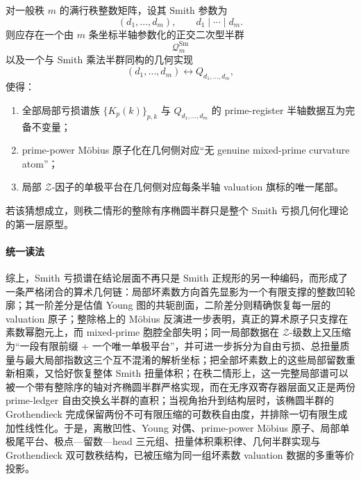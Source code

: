 \begin{conjecture}\label{conj:conclusion-smith-highrank-orthogonal-quadratic-realization}
对一般秩 \(m\) 的满行秩整数矩阵，设其 Smith 参数为
\[
(d_1,\dots,d_m),
\qquad
d_1\mid\cdots\mid d_m.
\]
则应存在一个由 \(m\) 条坐标半轴参数化的正交二次型半群
\[
\mathcal Q_m^{\mathrm{Sm}}
\]
以及一个与 Smith 乘法半群同构的几何实现
\[
(d_1,\dots,d_m)\longleftrightarrow Q_{d_1,\dots,d_m},
\]
使得：
\begin{enumerate}
  \item 全部局部亏损谱族 \(\{K_p(k)\}_{p,k}\) 与 \(Q_{d_1,\dots,d_m}\) 的 prime-register 半轴数据互为完备不变量；
  \item prime-power Möbius 原子化在几何侧对应“无 genuine mixed-prime curvature atom”；
  \item 局部 \(\mathcal Z\)-因子的单极平台在几何侧对应每条半轴 valuation 旗标的唯一尾部。
\end{enumerate}
若该猜想成立，则秩二情形的整除有序椭圆半群只是整个 Smith 亏损几何化理论的第一层原型。
\end{conjecture}

\paragraph{统一读法}
综上，Smith 亏损谱在结论层面不再只是 Smith 正规形的另一种编码，而形成了一条严格闭合的算术几何链：局部坏素数方向首先显影为一个有限支撑的整数凹轮廓；其一阶差分是估值 Young 图的共轭剖面，二阶差分则精确恢复每一层的 valuation 原子；整除格上的 Möbius 反演进一步表明，真正的算术原子只支撑在素数幂胞元上，而 mixed-prime 胞腔全部失明；同一局部数据在 \(\mathcal Z\)-级数上又压缩为“一段有限前缀 + 一个唯一单极平台”，并可进一步拆分为自由亏损、总扭量质量与最大局部指数这三个互不混淆的解析坐标；把全部坏素数上的这些局部留数重新相乘，又恰好恢复整体 Smith 扭量体积；在秩二情形上，这一完整局部谱可以被一个带有整除序的轴对齐椭圆半群严格实现，而在无序双寄存器层面又正是两份 prime-ledger 自由交换幺半群的直积；当视角抬升到结构层时，该椭圆半群的 Grothendieck 完成保留两份不可有限压缩的可数秩自由度，并排除一切有限生成加性线性化。于是，离散凹性、Young 对偶、prime-power Möbius 原子、局部单极尾平台、极点—留数—head 三元组、扭量体积乘积律、几何半群实现与 Grothendieck 双可数秩结构，已被压缩为同一组坏素数 valuation 数据的多重等价投影。

\endinput
